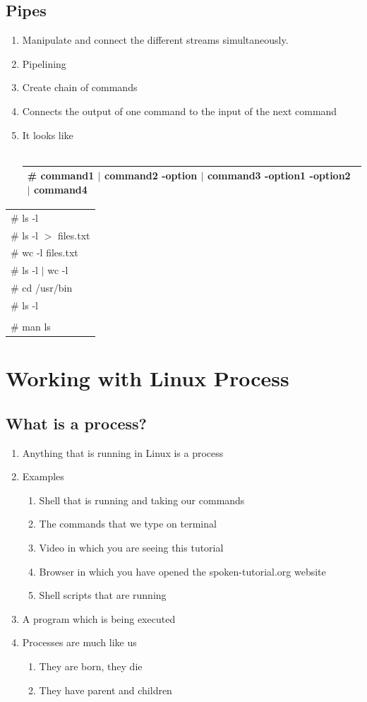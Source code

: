 \documentclass[12pt, a4paper]{report}
\begin{document}
\section{Pipes}
\begin{enumerate}
\item Manipulate and connect the different streams simultaneously.
\item Pipelining
\item Create chain of commands
\item Connects the output of one command to the input of the next command
\item It looks like\\
\\
\begin{tabular}{|l|}\hline
\# command1 $|$ command2 -option $|$ command3 -option1 -option2 $|$ command4\\ \hline
\end{tabular}
\end{enumerate}
\begin{tabular}{|l|}\hline\# ls -l\\
\# ls -l $>$ files.txt\\
\# wc -l files.txt\\
\# ls -l $|$ wc -l\\
\# cd /usr/bin\\
\# ls -l\\
\\
\# man ls\\ \hline
\end{tabular}
%
\chapter{Working with Linux Process}
\section{What is a process?}
\begin{enumerate}
\item	 Anything that is running in Linux is a process
\item Examples
\begin{enumerate}
\item Shell that is running and taking our commands
\item The commands that we type on terminal
\item Video in which you are seeing this tutorial
\item Browser in which you have opened the spoken-tutorial.org website
\item Shell scripts that are running
\end{enumerate}
\item A program which is being executed
\item Processes are much like us
\begin{enumerate}
\item They are born, they die
\item They have parent and children
\end{enumerate}
\end{enumerate}
\end{document}
